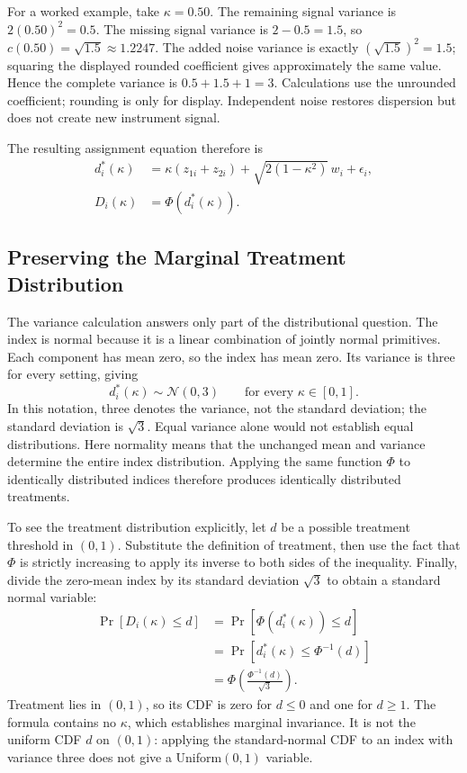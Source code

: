 For a worked example, take $\kappa=0.50$. The remaining signal variance is $2(0.50)^2=0.5$. The missing signal variance is $2-0.5=1.5$, so $c(0.50)=\sqrt{1.5}\approx1.2247$. The added noise variance is exactly $(\sqrt{1.5})^2=1.5$; squaring the displayed rounded coefficient gives approximately the same value. Hence the complete variance is $0.5+1.5+1=3$. Calculations use the unrounded coefficient; rounding is only for display. Independent noise restores dispersion but does not create new instrument signal.

The resulting assignment equation therefore is
\begin{equation}
 \begin{aligned}
 d_i^*(\kappa)&=\kappa(z_{1i}+z_{2i})+\sqrt{2(1-\kappa^2)}\,w_i+\epsilon_i,\\
 D_i(\kappa)&=\Phi\!\left(d_i^*(\kappa)\right).
 \end{aligned}
 \label{eq:appendix-kappa-assignment}
\end{equation}

\subsection{Preserving the Marginal Treatment Distribution}

The variance calculation answers only part of the distributional question. The index is normal because it is a linear combination of jointly normal primitives. Each component has mean zero, so the index has mean zero. Its variance is three for every setting, giving
\[
 d_i^*(\kappa)\sim\mathcal{N}(0,3)
 \qquad\text{for every }\kappa\in[0,1].
\]
In this notation, three denotes the variance, not the standard deviation; the standard deviation is $\sqrt{3}$. Equal variance alone would not establish equal distributions. Here normality means that the unchanged mean and variance determine the entire index distribution. Applying the same function $\Phi$ to identically distributed indices therefore produces identically distributed treatments.

To see the treatment distribution explicitly, let $d$ be a possible treatment threshold in $(0,1)$. Substitute the definition of treatment, then use the fact that $\Phi$ is strictly increasing to apply its inverse to both sides of the inequality. Finally, divide the zero-mean index by its standard deviation $\sqrt{3}$ to obtain a standard normal variable:
\begin{equation}
 \begin{aligned}
 \Pr\!\left[D_i(\kappa)\le d\right]
 &=\Pr\!\left[\Phi(d_i^*(\kappa))\le d\right]\\
 &=\Pr\!\left[d_i^*(\kappa)\le\Phi^{-1}(d)\right]\\
 &=\Phi\!\left(\frac{\Phi^{-1}(d)}{\sqrt{3}}\right).
 \end{aligned}
 \label{eq:appendix-treatment-cdf}
\end{equation}
Treatment lies in $(0,1)$, so its CDF is zero for $d\le0$ and one for $d\ge1$. The formula contains no $\kappa$, which establishes marginal invariance. It is not the uniform CDF $d$ on $(0,1)$: applying the standard-normal CDF to an index with variance three does not give a Uniform$(0,1)$ variable.

